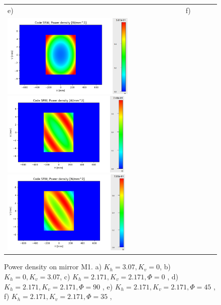 \documentclass[]{spie}  %
\begin{document}
\begin{figure} [ht]
\begin{center}
\begin{tabular}{l}
      e)~~~~~~~~~~~~~~~~~~~~~~~~~~~~~~~~~~~~~~~~~~~~~~~~~f)\\
      \includegraphics[height=4cm]{figures/powerdensityKhKv90.png}
      \includegraphics[height=4cm]{figures/powerdensityKhKv45.png}
      \includegraphics[height=4cm]{figures/powerdensityKhKv35.png}
\end{tabular}
\end{center}
\caption[example] 
{ \label{fig:M1powerdensity} 
Power density on mirror M1.
a) $K_h=3.07, K_v=0$,
b) $K_h=0,K_v=3.07$,
c) $K_h=2.171,K_v=2.171, \Phi=0$ \textdegree,
d) $K_h=2.171,K_v=2.171, \Phi=90$ \textdegree,
e) $K_h=2.171,K_v=2.171, \Phi=45$ \textdegree,
f) $K_h=2.171,K_v=2.171, \Phi=35$ \textdegree,
}
\end{figure} 





\end{document}
